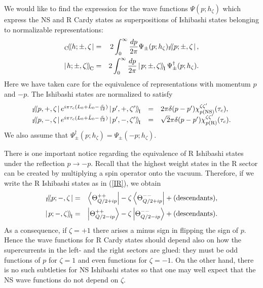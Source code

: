 \documentclass[a4paper,12pt]{article}
\newcommand{\bra}[1]{\left<{#1}\right|}
\newcommand{\ket}[1]{\left|{#1}\right>}
\newcommand{\cbra}[1]{_{\rm C}\!\!\left<\!\left<{#1}\right.\right|}
\newcommand{\cket}[1]{\left|\left.{#1}\right>\!\right>_{\rm \!C}}
\newcommand{\ibra}[1]{_{\rm I}\!\!\left<\!\left<{#1}\right.\right|}
\newcommand{\iket}[1]{\left|\left.{#1}\right>\!\right>_{\rm \!I}}
\newcommand{\NS}{{\rm NS}}
\newcommand{\R}{{\rm R}}
\begin{document}
   We would like to find the expression for the wave functions
 $\Psi(p;h_\zeta)$ which express the NS and R Cardy states as superpositions
 of Ishibashi states belonging to normalizable representations:
\begin{eqnarray}
  \cbra{h;\pm,\zeta}
  &=& 2\int_0^\infty\frac{dp}{2\pi}\Psi_\pm(p;h_\zeta)  \ibra{p;\pm,\zeta},
 \nonumber \\
  \cket{h;\pm,\zeta}
  &=& 2\int_0^\infty\frac{dp}{2\pi}\iket{p;\pm,\zeta}\Psi_\pm^\dag(p;h_\zeta).
\end{eqnarray}
 Here we have taken care for the equivalence of representations
 with momentum $p$ and $-p$.
 The Ishibashi states are normalized to satisfy
\begin{equation}
\begin{array}{rcl}
 \ibra{p,+,\zeta}e^{i\pi\tau_c(L_0+\bar{L}_0-\frac{c}{12})}
 \iket{p',+,\zeta'}
 &=& 2\pi\delta(p-p')\chi_{p(\NS)}^{\zeta\zeta'}(\tau_c), \\
 \ibra{p,-,\zeta}e^{i\pi\tau_c(L_0+\bar{L}_0-\frac{c}{12})}
 \iket{p',-,\zeta'}
 &=& \sqrt{2}\pi\delta(p-p')\chi_{p(\R)}^{\zeta\zeta'}(\tau_c).
\end{array}
\end{equation}
 We also assume that $\Psi_\pm^\dag(p;h_\zeta)=\Psi_\pm(-p;h_\zeta)$.

   There is one important notice regarding the equivalence of
 R Ishibashi states under the reflection $p\rightarrow -p$.
 Recall that the highest weight states in the R sector can be
 created by multiplying a spin operator onto the vacuum.
 Therefore, if we write the R Ishibashi states as in (\ref{IR}),
 we obtain
\begin{eqnarray}
  \ibra{p;-,\zeta} &=&
  \bra{\Theta_{Q/2+ip}^{++}}
 -\zeta\bra{\Theta_{Q/2+ip}^{--}}
 +(\mbox{descendants}), \nonumber \\
  \iket{p;-,\zeta} &=&
  \ket{\Theta_{Q/2-ip}^{++}}
 -\zeta\ket{\Theta_{Q/2-ip}^{--}}
 +(\mbox{descendants}).
\end{eqnarray}
 As a consequence, if $\zeta=+1$ there arises a minus sign in
 flipping the sign of $p$.
 Hence the wave functions for R Cardy states should depend also
 on how the supercurrents in the left- and the right sectors are
 glued: they must be odd functions of $p$ for $\zeta=1$ and
 even functions for $\zeta=-1$.
 On the other hand, there is no such subtleties for NS Ishibashi states
 so that one may well expect that the NS wave functions do not
 depend on $\zeta$.
\end{document}
